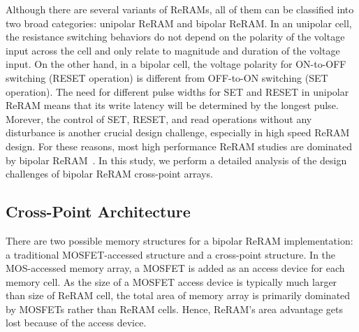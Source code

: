 
Although there are several variants of ReRAMs, all of them can be classified into two broad categories: unipolar ReRAM and bipolar ReRAM. In an unipolar cell, the resistance switching behaviors do not depend on the polarity of the voltage input across the cell and only relate to magnitude and duration of the voltage input. On the other hand, in a bipolar cell, the voltage polarity for ON-to-OFF switching (RESET operation) is different from OFF-to-ON switching (SET operation). %
The need for different pulse widths for SET and RESET in unipolar ReRAM means that its write latency will be determined by the longest pulse. Morever, the control of SET, RESET, and read operations without any disturbance is another crucial design challenge, especially in high speed ReRAM design. %
For these reasons, most high performance ReRAM studies are dominated by bipolar ReRAM~\cite{ReRAM_IEDM2010_Kim,ReRAM_ISSCC2011_Sheu,ReRAM_ISSCC2011_Otsuka}.
In this study, we perform a detailed analysis of the design challenges of bipolar ReRAM cross-point arrays.

\subsection{Cross-Point Architecture}
There are two possible memory structures for a bipolar ReRAM implementation: a traditional MOSFET-accessed structure and a cross-point structure. In the MOS-accessed memory array, a MOSFET is added as an access device for each memory cell. As the size of a MOSFET access device is typically much larger than size of ReRAM cell, the total area of memory array is primarily dominated by MOSFETs rather than ReRAM cells. Hence, ReRAM's area advantage gets lost because of the access device. %

